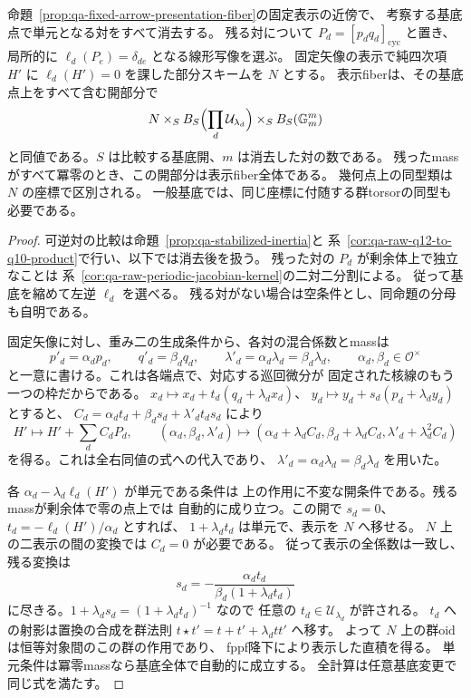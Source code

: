 \begin{corollary}[固定周期代数上の表示の局所標準形]
\label{cor:qa-fixed-arrow-slice}
命題~\ref{prop:qa-fixed-arrow-presentation-fiber}の固定表示の近傍で、
考察する基底点で単元となる対をすべて消去する。
残る対について $P_d=[p_dq_d]_{\mathrm{cyc}}$ と置き、
局所的に $\ell_d(P_e)=\delta_{de}$ となる線形写像を選ぶ。
固定矢像の表示で純四次項 $H'$ に
$\ell_d(H')=0$ を課した部分スキームを $N$ とする。
表示fiberは、その基底点上をすべて含む開部分で
\[
 N\times_S B_S\Bigl(\prod_d\mathcal U_{\lambda_d}\Bigr)
       \times_S B_S(\mathbb G_m^{m})
\]
と同値である。$S$ は比較する基底開、$m$ は消去した対の数である。
残ったmassがすべて冪零のとき、この開部分は表示fiber全体である。
幾何点上の同型類は $N$ の座標で区別される。
一般基底では、同じ座標に付随する群torsorの同型も必要である。
\end{corollary}
\begin{proof}
可逆対の比較は命題~\ref{prop:qa-stabilized-inertia}と
系~\ref{cor:qa-raw-q12-to-q10-product}で行い、以下では消去後を扱う。
残った対の $P_d$ が剰余体上で独立なことは
系~\ref{cor:qa-raw-periodic-jacobian-kernel}の二対二分割による。
従って基底を縮めて左逆 $\ell_d$ を選べる。
残る対がない場合は空条件とし、同命題の分母も自明である。

固定矢像に対し、重み二の生成条件から、各対の混合係数とmassは
\[
 p'_d=\alpha_d p_d,\qquad q'_d=\beta_d q_d,\qquad
 \lambda'_d=\alpha_d\lambda_d=\beta_d\lambda_d,
 \qquad \alpha_d,\beta_d\in\mathcal O^\times
\]
と一意に書ける。これは各端点で、対応する巡回微分が
固定された核線のもう一つの枠だからである。
$x_d\mapsto x_d+t_d(q_d+\lambda_dx_d)$、
$y_d\mapsto y_d+s_d(p_d+\lambda_dy_d)$ とすると、
$C_d=\alpha_dt_d+\beta_ds_d+\lambda'_dt_ds_d$ により
\[
 H'\longmapsto H'+\sum_d C_dP_d,
 \qquad
 (\alpha_d,\beta_d,\lambda'_d)
 \longmapsto
 (\alpha_d+\lambda_d C_d,\beta_d+\lambda_d C_d,
     \lambda'_d+\lambda_d^2 C_d)
\]
を得る。これは全右同値の式への代入であり、
$\lambda'_d=\alpha_d\lambda_d=\beta_d\lambda_d$ を用いた。

各 $\alpha_d-\lambda_d\ell_d(H')$ が単元である条件は
上の作用に不変な開条件である。残るmassが剰余体で零の点上では
自動的に成り立つ。この開で $s_d=0$、
$t_d=-\ell_d(H')/\alpha_d$ とすれば、
$1+\lambda_dt_d$ は単元で、表示を $N$ へ移せる。
$N$ 上の二表示の間の変換では $C_d=0$ が必要である。
従って表示の全係数は一致し、残る変換は
\[
 s_d=-\frac{\alpha_dt_d}{\beta_d(1+\lambda_dt_d)}
\]
に尽きる。$1+\lambda_ds_d=(1+\lambda_dt_d)^{-1}$ なので
任意の $t_d\in\mathcal U_{\lambda_d}$ が許される。
$t_d$ への射影は置換の合成を群法則
$t\star t'=t+t'+\lambda_dt t'$ へ移す。
よって $N$ 上の群oidは恒等対象間のこの群の作用であり、
fppf降下により表示した直積を得る。
単元条件は冪零massなら基底全体で自動的に成立する。
全計算は任意基底変更で同じ式を満たす。
\end{proof}

